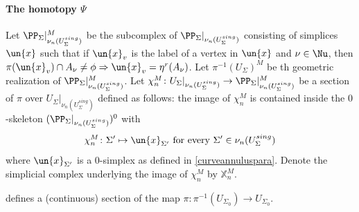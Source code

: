 \documentclass[a4paper,10pt]{amsart}
\begin{document}
\paragraph{\textbf{The homotopy $\Psi$}}\label{psiproprmain} Let $\PP_{\Sigma}|_{\nu_n(U_{\Sigma}^{sing})}^M$ be the subcomplex of $\PP_{\Sigma}|_{\nu_n(U_{\Sigma}^{sing})}$ consisting of simplices $\un{x}$ such that if $\un{x}_v$  is the label of a vertex in $\un{x}$ and $\nu \in \Nu$, then $\pi(\un{x}_v) \cap A_{\nu} \neq \phi \Rightarrow \un{x}_v = \eta^r(A_{\nu})$. Let $\pi^{-1}(U_{\Sigma})^M$ be th geometric realization of $\PP_{\Sigma}|_{\nu_n(U_{\Sigma}^{sing})}^M$.
Let $\chi^M_n \colon U_{\Sigma}|_{\nu_n(U_\Sigma^{sing})}  \to \PP_{\Sigma}|_{\nu_n(U_{\Sigma}^{sing})}^M$ be a section of $\pi$ over $U_{\Sigma}|_{\nu_n(U_\Sigma^{sing})}$ defined as follows: the image of $\chi^M_n $ is contained inside the $0$-skeleton $(\PP_{\Sigma}|_{\nu_n(U_{\Sigma}^{sing})})^0$ with 
\[ \chi^M_n \colon \Sigma^\prime \mapsto \un{x}_{\Sigma^{\prime}} \mbox{ for every } \Sigma^{\prime} \in \nu_n(U_{\Sigma}^{sing})\]
where $\un{x}_{\Sigma^{\prime}}$ is a $0$-simplex as defined in \ref{curveannuluspara}. Denote the simplicial complex underlying the image of $\chi^M_n$ by $\mathbb{X}^M_n$.

defines a (continuous) section of the map $\pi \colon \pi^{-1}(U_{\Sigma_0}) \to U_{\Sigma_0}$.\\
\end{document}
